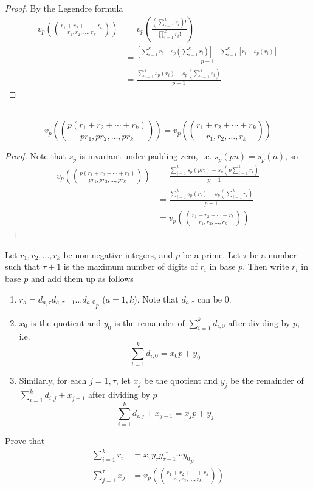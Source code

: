 \documentclass{treatise}
\begin{document}
\begin{proof}
By the Legendre formula
\begin{align*}
v_p \left( {r_1 + r_2 + \cdots + r_k \choose r_1, r_2, \hdots, r_k} \right) & = v_p \left( \frac{\left( \sum_{i = 1}^k r_i \right)!}{\prod_{i = 1}^k r_i!} \right) \\
& = \frac{\left[ \sum_{i = 1}^k r_i - s_p \left( \sum_{i = 1}^k r_i \right) \right] - \sum_{i = 1}^k [r_i - s_p (r_i)]}{p - 1} \\
& = \frac{\sum_{i = 1}^k s_p(r_i) - s_p \left( \sum_{i = 1}^k r_i \right)}{p - 1}
\end{align*}
\end{proof}
\begin{corollary} \label{p-adic-reduct} \ 
$$v_p \left( {p(r_1 + r_2 + \cdots + r_k) \choose p r_1, p r_2, \hdots, p r_k} \right) = v_p \left( {r_1 + r_2 + \cdots + r_k \choose r_1, r_2, \hdots, r_k} \right)$$
\end{corollary}
\begin{proof}
Note that $s_p$ is invariant under padding zero, i.e. $s_p (pn) = s_p (n)$, so
\begin{align*}
v_p \left( {p(r_1 + r_2 + \cdots + r_k) \choose p r_1, p r_2, \hdots, p r_k} \right) & = \frac{\sum_{i = 1}^k s_p(pr_i) - s_p \left( p \sum_{i = 1}^k r_i \right)}{p - 1} \\
& = \frac{\sum_{i = 1}^k s_p(r_i) - s_p \left( \sum_{i = 1}^k r_i \right)}{p - 1} \\
& = v_p \left( {r_1 + r_2 + \cdots + r_k \choose r_1, r_2, \hdots, r_k} \right)
\end{align*}
\end{proof}
\begin{proposition} \label{p-adic-high-school-addition}
Let $r_1, r_2, \hdots, r_k$ be non-negative integers, and $p$ be a prime. Let $\tau$ be a number such that $\tau + 1$ is the maximum number of digits of $r_i$ in base $p$. Then write $r_i$ in base $p$ and add them up as follows
\begin{enumerate}
	\item $r_a = \overline{d_{a, \tau} d_{a, \tau - 1} \hdots d_{a, 0}}_p$ ($a = \overline{1, k}$). Note that $d_{a, \tau}$ can be $0$.
	\item $x_0$ is the quotient and $y_0$ is the remainder of $\sum_{i = 1}^k d_{i, 0}$ after dividing by $p$, i.e.
	$$\sum_{i = 1}^k d_{i, 0} = x_0 p + y_0$$ 
	\item Similarly, for each $j = \overline{1, \tau}$, let $x_j$ be the quotient and $y_j$ be the remainder of $\sum_{i = 1}^k d_{i, j} + x_{j - 1}$ after dividing by $p$
	$$\sum_{i = 1}^k d_{i, j} + x_{j - 1} = x_j p + y_j$$
\end{enumerate}
Prove that
\begin{align*}
\sum_{i = 1}^k r_i & = \overline{x_\tau y_\tau y_{\tau - 1} \cdots y_0}_p \\
\sum_{j = 1}^\tau x_j & = v_p \left( {r_1 + r_2 + \cdots + r_k \choose r_1, r_2, \hdots, r_k} \right)
\end{align*}
\end{proposition}
\end{document}
